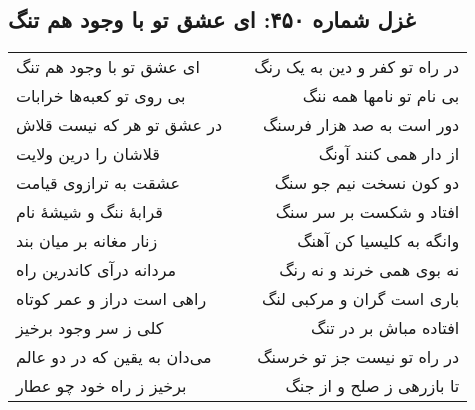 \begin{center}
\section*{غزل شماره ۴۵۰: ای عشق تو با وجود هم تنگ}
\label{sec:450}
\begin{longtable}{l p{0.5cm} r}
ای عشق تو با وجود هم تنگ
&&
در راه تو کفر و دین به یک رنگ
\\
بی روی تو کعبه‌ها خرابات
&&
بی نام تو نامها همه ننگ
\\
در عشق تو هر که نیست قلاش
&&
دور است به صد هزار فرسنگ
\\
قلاشان را درین ولایت
&&
از دار همی کنند آونگ
\\
عشقت به ترازوی قیامت
&&
دو کون نسخت نیم جو سنگ
\\
قرابهٔ ننگ و شیشهٔ نام
&&
افتاد و شکست بر سر سنگ
\\
زنار مغانه بر میان بند
&&
وانگه به کلیسیا کن آهنگ
\\
مردانه درآی کاندرین راه
&&
نه بوی همی خرند و نه رنگ
\\
راهی است دراز و عمر کوتاه
&&
باری است گران و مرکبی لنگ
\\
کلی ز سر وجود برخیز
&&
افتاده مباش بر در تنگ
\\
می‌دان به یقین که در دو عالم
&&
در راه تو نیست جز تو خرسنگ
\\
برخیز ز راه خود چو عطار
&&
تا بازرهی ز صلح و از جنگ
\\
\end{longtable}
\end{center}
